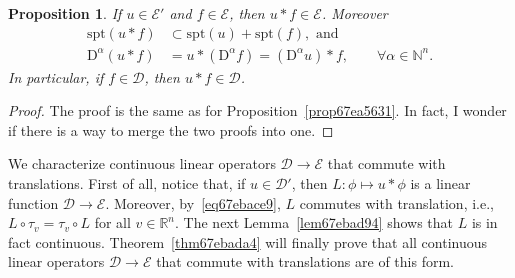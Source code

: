 \documentclass[a4paper,9pt]{amsart}
\newcommand{\scr}[1]{\mathscr{#1}}
\newcommand{\N}{\mathbb{N}}	%
\newcommand{\R}{\mathbb{R}}	%
\newcommand{\Diff}{\mathrm{D}}
\newcommand{\spt}{\mathrm{spt}}
\theoremstyle{plain}
\newtheorem{proposition}{Proposition}[section]
\theoremstyle{definition}
\theoremstyle{remark}
\begin{document}
\begin{proposition}\label{prop67f21c33}
	If $u\in\scr E'$ and $f\in\scr E$, then $u*f\in\scr E$.
	Moreover
	\begin{align}
		\label{eq67f298b5}
		\spt(u*f) &\subset \spt(u) + \spt(f), \text{ and } \\
		\label{eq67f29911}
		\Diff^\alpha(u*f) &= u*(\Diff^\alpha f) = (\Diff^\alpha u)*f,
		\qquad \forall\alpha\in\N^n .
	\end{align} 
	In particular, if $f\in\scr D$, then $u*f\in\scr D$.
\end{proposition}
\begin{proof}
	The proof is the same as for Proposition~\ref{prop67ea5631}.
	In fact, I wonder if there is a way to merge the two proofs into one.
\end{proof}

We characterize continuous linear operators $\scr D\to\scr E$ that commute with translations.
First of all, notice that, if $u\in\scr D'$, then $L:\phi\mapsto u*\phi$ is a linear function $\scr D\to\scr E$.
Moreover, by~\eqref{eq67ebace9}, $L$ commutes with translation, i.e., $L\circ\tau_v = \tau_v\circ L$ for all $v\in\R^n$.
The next Lemma~\ref{lem67ebad94} shows that $L$ is in fact continuous.
Theorem~\ref{thm67ebada4} will finally prove that all continuous linear operators $\scr D\to\scr E$ that commute with translations are of this form.
\end{document}
